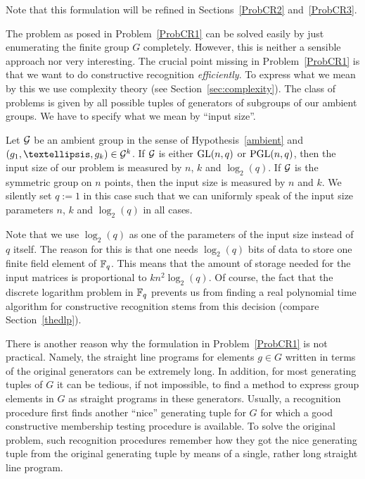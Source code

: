 Note that this formulation will be refined in Sections~\ref{ProbCR2} 
and~\ref{ProbCR3}.

\smallskip
The problem as posed in Problem~\ref{ProbCR1} can be solved easily by just
enumerating the finite group $G$ completely. However, this is neither
a sensible approach nor very interesting. The crucial point missing
in Problem~\ref{ProbCR1} is that we want to do constructive recognition
\emph{efficiently}. To express what we mean by this we use complexity
theory (see Section~\ref{sec:complexity}). 
The class of problems is given by all possible tuples of
generators of subgroups of our ambient groups. We have to specify
what we mean by ``input size''.

\begin{Def}
\label{inputsize}
%
Let $\mathcal{G}$ be an ambient group in the sense of Hypothesis~\ref{ambient}
and $(g_1, \ldots, g_k) \in \GG^k$. If $\mathcal{G}$ is either $\GL(n,q)$ or
$\PGL(n,q)$, then the input size of our problem is measured by $n$, $k$
and $\log_2(q)$. If $\mathcal{G}$ is the symmetric group on $n$ points, then the
input size is measured by $n$ and $k$. We silently set $q := 1$ in this
case such that we can uniformly speak of the input size parameters $n$, $k$
and $\log_2(q)$ in all cases.
\end{Def}

\begin{Rem}
Note that we use $\log_2(q)$ as one of the parameters of the input size
instead of $q$ itself. The reason for this is that one needs
$\log_2(q)$ bits of data to store one finite field element of $\mathbb{F}_q$.
This means that the amount of storage needed for the input matrices is
proportional to $kn^2\log_2(q)$. Of course, the fact that the discrete
logarithm problem in $\mathbb{F}_q$ prevents us from finding a real polynomial
time algorithm for constructive recognition stems from this decision
(compare Section~\ref{thedlp}).
\proofend
\end{Rem}

There is another reason why the formulation in Problem~\ref{ProbCR1} is not
practical. Namely, the straight line programs for elements $g \in G$
written in terms of the original generators can be extremely long. In
addition, for most generating tuples of $G$ it can be tedious, if not
impossible, to find a method to express group elements in $G$ as straight
programs in these generators. Usually, a recognition procedure first finds
another ``nice'' generating tuple for $G$ for which a good constructive
%
membership testing procedure is available. To solve the original problem,
such recognition procedures remember how they got the nice generating
tuple from the original generating tuple by means of a single, rather long
straight line program.
%

